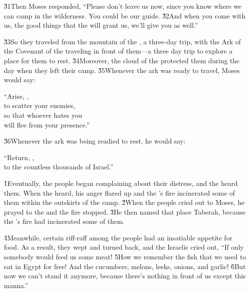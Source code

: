 \v{31}Then Moses responded, ``Please don't leave us now, since you know where we can camp in the wilderness. You could be our guide. \v{32}And when you come with us, the good things that the  will grant us, we'll give you as well.''

\v{33}So they traveled from the mountain of the , a three-day trip, with the Ark of the Covenant of the  traveling in front of them---a three day trip to explore a place for them to rest. \v{34}Moreover, the cloud of the  protected them during the day when they left their camp. \v{35}Whenever the ark was ready to travel, Moses would say:

\begin{poetry}
\poeml ``Arise, , \\
\poemll    to scatter your enemies, \\
\poeml so that whoever hates you \\
\poemll    will flee from your presence.''
\end{poetry}

\v{36}Whenever the ark was being readied to rest, he would say:

\begin{poetry}
\poeml ``Return, , \\
\poemll    to the countless thousands of Israel.''
\end{poetry}

\v{1}Eventually, the people began complaining about their distress, and the  heard them. When the  heard, his anger flared up and the 's fire incinerated some of them within the outskirts of the camp. \v{2}When the people cried out to Moses, he prayed to the  and the fire stopped. \v{3}He then named that place Taberah, because the 's fire had incinerated some of them.

\v{4}Meanwhile, certain riff-raff among the people had an insatiable appetite for food. As a result, they wept and turned back, and the Israelis cried out, ``If only somebody would feed us some meat! \v{5}How we remember the fish that we used to eat in Egypt for free! And the cucumbers, melons, leeks, onions, and garlic! \v{6}But now we can't stand it anymore, because there's nothing in front of us except this manna.''

